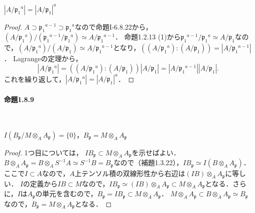 \begin{screen}\label{order_prime_power}
  $|A/\mathfrak{p}_1{}^a| = |A/\mathfrak{p}_1|^a$
\end{screen}
\begin{proof}
  $A\supset\mathfrak{p}_1{}^{a-1}\supset\mathfrak{p}_1{}^a$なので命題I-6.8.22から，$(A/\mathfrak{p}_1{}^a)/(\mathfrak{p}_1{}^{a-1}/\mathfrak{p}_1{}^a)\simeq A/\mathfrak{p}_1{}^{a-1}$．
  命題1.2.13 (1)から$\mathfrak{p}_1{}^{a-1}/\mathfrak{p}_1{}^a\simeq A/\mathfrak{p}_1$なので，$(A/\mathfrak{p}_1{}^a)/(A/\mathfrak{p}_1)\simeq A/\mathfrak{p}_1{}^{a-1}$となり，$((A/\mathfrak{p}_1{^a}):(A/\mathfrak{p}_1)) = |A/\mathfrak{p}_1{}^{a-1}|$．
  Lagrangeの定理から，
  \[|A/\mathfrak{p}_1{}^a| = ((A/\mathfrak{p}_1{^a}):(A/\mathfrak{p}_1))|A/\mathfrak{p}_1| = |A/\mathfrak{p}_1{}^{a-1}||A/\mathfrak{p}_1|.\]
  これを繰り返して，$|A/\mathfrak{p}_1{}^a| = |A/\mathfrak{p}_1|^a$．
\end{proof}

\paragraph{命題1.8.9}~
\begin{screen}
  $I(B_\mathfrak{p}/M\otimes_AA_\mathfrak{p}) = \{0\}$，$B_\mathfrak{p} = M \otimes_A A_\mathfrak{p}$
\end{screen}
\begin{proof}
  1つ目については， $IB_\mathfrak{p} \subset M \otimes_A A_\mathfrak{p}$を示せばよい．
  $B \otimes_A A_\mathfrak{p} = B \otimes_A S^{-1}A \simeq S^{-1}B = B_\mathfrak{p}$なので（補題1.3.22），$IB_\mathfrak{p} \simeq I(B \otimes_A A_\mathfrak{p})$．ここで$I\subset A$なので，$A$上テンソル積の双線形性から右辺は$(IB) \otimes_A A_\mathfrak{p}$に等しい．
  $I$の定義から$IB \subset M$なので，$IB_\mathfrak{p} \simeq (IB) \otimes_A A_\mathfrak{p} \subset M \otimes_A A_\mathfrak{p}$となる．さらに，$I$は$A_\mathfrak{p}$の単元を含むので，$B_\mathfrak{p} = IB_\mathfrak{p} \subset M \otimes_A A_\mathfrak{p}$．
  $M \otimes_A A_\mathfrak{p} \subset B \otimes_A A_\mathfrak{p} \simeq B_\mathfrak{p}$なので，$B_\mathfrak{p} = M \otimes_A A_\mathfrak{p}$となる．
\end{proof}

